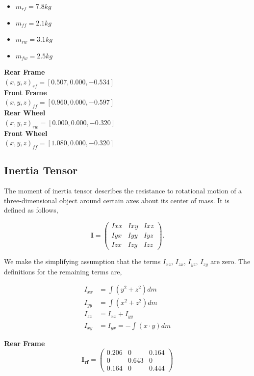 \documentclass[a4paper]{article}
\begin{document}
\begin{itemize}
\item $m_{rf} = 7.8 kg$
\item $m_{ff} = 2.1 kg$
\item $m_{rw} = 3.1 kg$
\item $m_{fw} = 2.5 kg$
\end{itemize}

\noindent \textbf{Rear Frame} \\
$(x, y, z)_{rf} = [0.507, 0.000, -0.534]$ \\

\noindent \textbf{Front Frame} \\
$(x, y, z)_{ff} = [0.960, 0.000, -0.597]$ \\

\noindent \textbf{Rear Wheel} \\
$(x, y, z)_{rw} = [0.000, 0.000, -0.320]$ \\

\noindent \textbf{Front Wheel} \\
$(x, y, z)_{ff} = [1.080, 0.000, -0.320]$

\subsection{Inertia Tensor}
The moment of inertia tensor describes the resistance to rotational motion of a three-dimensional object around certain axes about its center of mass. It is defined as follows,

\begin{equation*}
\mathbf{I} = 
\begin{pmatrix}
Ixx & Ixy & Ixz \\
Iyx & Iyy & Iyz \\
Izx & Izy & Izz
\end{pmatrix}.
\end{equation*}

\noindent We make the simplifying assumption that the terms $I_{xz}$, $I_{zx}$, $I_{yz}$, $I_{zy}$ are zero. The definitions for the remaining terms are,

\begin{align*}
I_{xx} &= \int (y^2 + z^2) dm \\
I_{yy} &= \int (x^2 + z^2) dm \\
I_{zz} &= I_{xx} + I_{yy} \\
I_{xy} &= I_{yx} = - \int (x \cdot y )dm
\end{align*}

\noindent \textbf{Rear Frame} \\
\begin{equation*}
\mathbf{I_{rf}} = \begin{pmatrix}
0.206 & 0 & 0.164 \\
0 & 0.643 & 0 \\
0.164 & 0 & 0.444
\end{pmatrix}
\end{equation*}
\end{document}
